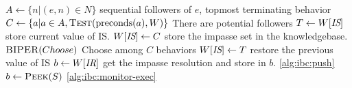 \begin{algorithmic}[1]
\Statex

\State $A\gets \{n | (e,n)\in N\}$ \Comment sequential followers of $e$, topmost terminating behavior
\State $C\gets \{a | a\in A, \Call{Test}{\pre(a),W}\}$
 \Comment There are potential followers
  \State $T\gets W[\textit{IS}]$ \Comment store current value of IS.
  \State $W[\textit{IS}]\gets C$ \Comment store the impasse set in the knowledgebase.
  \State $\Call{BIPER}{Choose}$ \label{alg:ibc:choose-vote} \Comment Choose among $C$ behaviors
  \State $W[\textit{IS}]\gets T$ \Comment restore the previous value of IS
  \State $b\gets W[\textit{IR}]$ \Comment get the impasse resolution and store in $b$.
   \ref{alg:ibc:push}
\EndIf
\State $b\gets\Call{Peek}{S}$ 
   \ref{alg:ibc:monitor-exec} %
\EndIf

\EndProcedure
\end{algorithmic}
